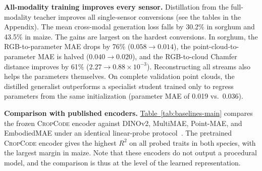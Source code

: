 \documentclass[10pt,twocolumn,letterpaper]{article}
\newcommand{\tabref}[1]{\hyperref[#1]{Table~\ref*{#1}}}
\newcommand{\appendixref}[1]{\hyperref[#1]{Appendix~\ref*{#1}}}
\newcommand{\method}{\textup{\textsc{CropCode}}}   %
\begin{document}
\noindent\textbf{All-modality training improves every sensor.}
Distillation from the full-modality teacher improves all single-sensor conversions (see the tables in the Appendix).%
The mean cross-modal generation loss falls by 30.2\% in sorghum and 43.5\% in maize. The gains are largest on the hardest conversions. In sorghum, the RGB-to-parameter MAE drops by 76\% ($0.058 \to 0.014$), the point-cloud-to-parameter MAE is halved ($0.040 \to 0.020$), and the RGB-to-cloud Chamfer distance improves by 61\% ($2.27 \to 0.88 \times 10^{-3}$). Reconstructing all streams also helps the parameters themselves. On complete validation point clouds, the distilled generalist outperforms a specialist student trained only to regress parameters from the same initialization (parameter MAE of 0.019 vs.\ 0.036).

\noindent\textbf{Comparison with published encoders.}
\tabref{tab:baselines-main} compares the frozen \method{} encoder against DINOv2, MultiMAE, Point-MAE, and EmbodiedMAE under an identical linear-probe protocol~\citep{chen2020simclr}. The pretrained \method{} encoder gives the highest $R^2$ on all probed traits in both species, with the largest margin in maize. Note that these encoders do not output a procedural model, and the comparison is thus at the level of the learned representation.
\end{document}
